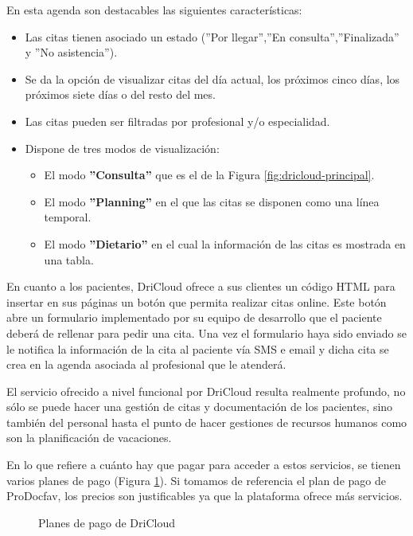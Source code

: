 En esta agenda son destacables las siguientes características:

\begin{itemize}
    \item Las citas tienen asociado un estado (''Por llegar'',''En consulta'',''Finalizada'' y ''No asistencia'').
    \item Se da la opción de visualizar citas del día actual, los próximos cinco días, los próximos siete días o del resto del mes.
    \item Las citas pueden ser filtradas por profesional y/o especialidad.
    \item Dispone de tres modos de visualización:
    \begin{itemize}
        \item El modo \textbf{''Consulta''} que es el de la Figura \ref{fig:dricloud-principal}.
        \item El modo \textbf{''Planning''} en el que las citas se disponen como una línea temporal.
        \item El modo \textbf{''Dietario''} en el cual la información de las citas es mostrada en una tabla.
    \end{itemize}
\end{itemize}

En cuanto a los pacientes, DriCloud ofrece a sus clientes un código HTML para insertar en sus páginas un botón que permita realizar citas online. Este botón abre un formulario implementado por su equipo de desarrollo que el paciente deberá de rellenar para pedir una cita. Una vez el formulario haya sido enviado se le notifica la información de la cita al paciente vía SMS e email y dicha cita se crea en la agenda asociada al profesional que le atenderá. \bigskip

El servicio ofrecido a nivel funcional por DriCloud resulta realmente profundo, no sólo se puede hacer una gestión de citas y documentación de los pacientes, sino también del personal hasta el punto de hacer gestiones de recursos humanos como son la planificación de vacaciones. \bigskip

En lo que refiere a cuánto hay que pagar para acceder a estos servicios, se tienen varios planes de pago (Figura \ref{fig:dricloud-precios}). Si tomamos de referencia el plan de pago de ProDocfav, los precios son justificables ya que la plataforma ofrece más servicios. \bigskip

\begin{figure}[H]
    \caption{Planes de pago de DriCloud}
    \label{fig:dricloud-precios}
\end{figure}

